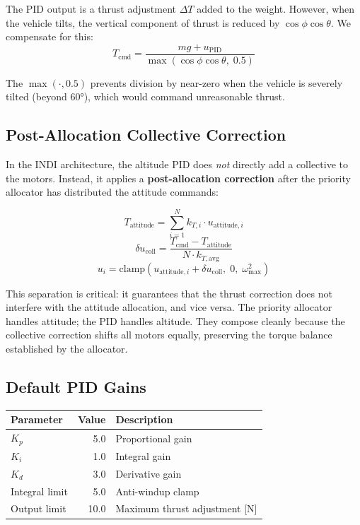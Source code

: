 \documentclass[12pt, a4paper]{article}
\begin{document}
The PID output is a thrust adjustment $\Delta T$ added to the weight.  However, when the vehicle tilts, the vertical component of thrust is reduced by $\cos\phi\cos\theta$.  We compensate for this:
\begin{equation}
    T_{\text{cmd}} = \frac{mg + u_{\text{PID}}}{\max(\cos\phi\cos\theta, \; 0.5)}
\end{equation}

The $\max(\cdot, 0.5)$ prevents division by near-zero when the vehicle is severely tilted (beyond $60°$), which would command unreasonable thrust.

\subsection{Post-Allocation Collective Correction}

In the INDI architecture, the altitude PID does \emph{not} directly add a collective to the motors.  Instead, it applies a \textbf{post-allocation correction} after the priority allocator has distributed the attitude commands:

\begin{equation}
    T_{\text{attitude}} = \sum_{i=1}^{N} k_{T,i} \cdot u_{\text{attitude},i}
\end{equation}
\begin{equation}
    \delta u_{\text{coll}} = \frac{T_{\text{cmd}} - T_{\text{attitude}}}{N \cdot k_{T,\text{avg}}}
\end{equation}
\begin{equation}
    u_i = \text{clamp}(u_{\text{attitude},i} + \delta u_{\text{coll}}, \; 0, \; \omega_{\max}^2)
\end{equation}

This separation is critical: it guarantees that the thrust correction does not interfere with the attitude allocation, and vice versa.  The priority allocator handles attitude; the PID handles altitude.  They compose cleanly because the collective correction shifts all motors equally, preserving the torque balance established by the allocator.

\subsection{Default PID Gains}

\begin{table}[H]
\centering
\begin{tabular}{lrl}
\toprule
Parameter & Value & Description \\
\midrule
$K_p$ & 5.0 & Proportional gain \\
$K_i$ & 1.0 & Integral gain \\
$K_d$ & 3.0 & Derivative gain \\
Integral limit & 5.0 & Anti-windup clamp \\
Output limit & 10.0 & Maximum thrust adjustment [N] \\
\bottomrule
\end{tabular}
\end{table}
\end{document}
